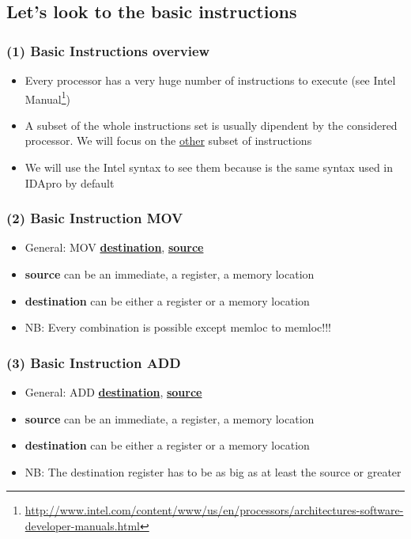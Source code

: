 \documentclass[]{beamer}
\begin{document}
	\subsection{Let's look to the basic instructions}
		\begin{frame}
			\frametitle{(1) Basic Instructions overview}
				\begin{itemize}
					\item{Every processor has a very huge number of instructions to execute (see Intel Manual\footnote{\url{http://www.intel.com/content/www/us/en/processors/architectures-software-developer-manuals.html}})}
					\item{A subset of the whole instructions set is usually dipendent by the considered processor. We will focus on the \underline{other} subset of instructions}
					\item{We will use the Intel syntax to see them because is the same syntax used in IDApro by default}
				\end{itemize}
		\end{frame}
		\begin{frame}
			\frametitle{(2) Basic Instruction MOV}
				\begin{itemize}
					\item{ General: MOV \underline{\textbf{destination}}, \underline{\textbf{source}}}
					\newline		
					\item{	\textbf{source} can be an immediate, a register, a memory location}
					\newline
					\item{	\textbf{destination} can be either a register  or a memory location}
					\newline
					\item{	NB: Every combination is possible except memloc to memloc!!!}
				\end{itemize}
		\end{frame}
		\begin{frame}
			\frametitle{(3) Basic Instruction ADD}
				\begin{itemize}
					\item{General: ADD \underline{\textbf{destination}}, \underline{\textbf{source}}}
					\newline
					\item{\textbf{source} can be an immediate, a register, a memory location}
					\newline
					\item{\textbf{destination} can be either a register or a memory location}
					\newline
					\item{NB: The destination register has to be as big as at least the source or greater }
				\end{itemize}
		\end{frame}
\end{document}
